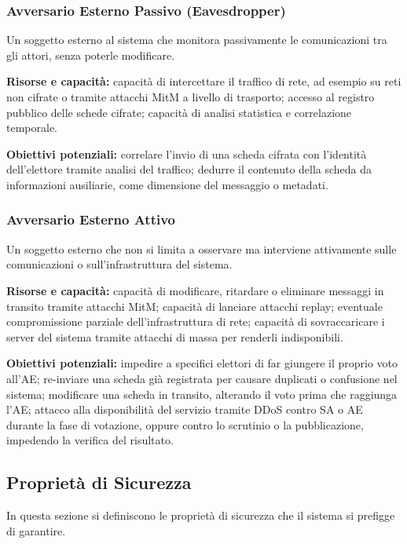 \documentclass[12pt,a4paper]{article}
\begin{document}
\subsubsection{Avversario Esterno Passivo (Eavesdropper)}

Un soggetto esterno al sistema che monitora passivamente le comunicazioni tra gli attori, senza
poterle modificare.

\textbf{Risorse e capacità:} capacità di intercettare il traffico di rete, ad esempio su reti
non cifrate o tramite attacchi MitM a livello di trasporto; accesso al registro pubblico delle
schede cifrate; capacità di analisi statistica e correlazione temporale.

\textbf{Obiettivi potenziali:} correlare l'invio di una scheda cifrata con l'identità
dell'elettore tramite analisi del traffico; dedurre il contenuto della scheda da informazioni
ausiliarie, come dimensione del messaggio o metadati.

\subsubsection{Avversario Esterno Attivo}

Un soggetto esterno che non si limita a osservare ma interviene attivamente sulle comunicazioni
o sull'infrastruttura del sistema.

\textbf{Risorse e capacità:} capacità di modificare, ritardare o eliminare messaggi in transito
tramite attacchi MitM; capacità di lanciare attacchi replay; eventuale compromissione parziale
dell'infrastruttura di rete; capacità di sovraccaricare i server del sistema tramite attacchi di
massa per renderli indisponibili.

\textbf{Obiettivi potenziali:} impedire a specifici elettori di far giungere il proprio voto
all'AE; re-inviare una scheda già registrata per causare duplicati o confusione nel sistema;
modificare una scheda in transito, alterando il voto prima che raggiunga l'AE; attacco alla
disponibilità del servizio tramite DDoS contro SA o AE durante la fase di votazione, oppure
contro lo scrutinio o la pubblicazione, impedendo la verifica del risultato.

\subsection{Proprietà di Sicurezza}

In questa sezione si definiscono le proprietà di sicurezza che il sistema si prefigge di
garantire.
\end{document}
